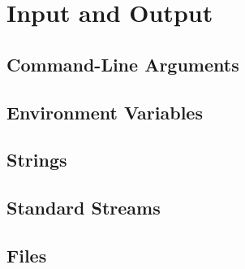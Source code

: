 \chapter{Input and Output}

\section{Command-Line Arguments}
\csharpsubsection{\csharp}

\section{Environment Variables}
\csharpsubsection{\csharp}

\section{Strings}
\csharpsubsection{\csharp}

\section{Standard Streams}
\csharpsubsection{\csharp}

\section{Files}
\csharpsubsection{\csharp}

